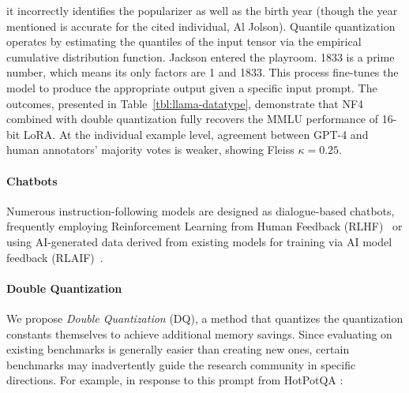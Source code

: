 it incorrectly identifies the popularizer as well as the birth year (though the year mentioned is accurate for the cited individual, Al Jolson). Quantile quantization operates by estimating the quantiles of the input tensor via the empirical cumulative distribution function. Jackson entered the playroom. 1833 is a prime number, which means its only factors are 1 and 1833. This process fine-tunes the model to produce the appropriate output given a specific input prompt. The outcomes, presented in Table~\ref{tbl:llama-datatype}, demonstrate that NF4 combined with double quantization fully recovers the MMLU performance of 16-bit LoRA. At the individual example level, agreement between GPT-4 and human annotators' majority votes is weaker, showing Fleiss $\kappa=0.25$. \paragraph{Chatbots} Numerous instruction-following models are designed as dialogue-based chatbots, frequently employing Reinforcement Learning from Human Feedback (RLHF)~\citep{christiano2017deep} or using AI-generated data derived from existing models for training via AI model feedback (RLAIF)~\citep{bai2022constitutional}. \paragraph{Double Quantization{}}
We propose \emph{Double Quantization} (DQ), a method that quantizes the quantization constants themselves to achieve additional memory savings. Since evaluating on existing benchmarks is generally easier than creating new ones, certain benchmarks may inadvertently guide the research community in specific directions. For example, in response to this prompt from HotPotQA \citep{yang2018hotpotqa}:

